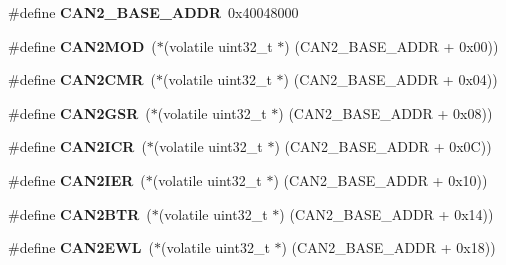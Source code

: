 \begin{DoxyCompactItemize}
\mbox{\label{group__lpc24xx__regs_ga6e8917334a8169aca752577ba0c27b8b}} 
\#define {\bfseries C\+A\+N2\+\_\+\+B\+A\+S\+E\+\_\+\+A\+D\+DR}~0x40048000
\item 
\mbox{\label{group__lpc24xx__regs_ga2abc61e5c8a37e1ddca5490e1e3fb149}} 
\#define {\bfseries C\+A\+N2\+M\+OD}~($\ast$(volatile uint32\+\_\+t $\ast$) (C\+A\+N2\+\_\+\+B\+A\+S\+E\+\_\+\+A\+D\+DR + 0x00))
\item 
\mbox{\label{group__lpc24xx__regs_gade2e60da875c96b0e65087ed452283ca}} 
\#define {\bfseries C\+A\+N2\+C\+MR}~($\ast$(volatile uint32\+\_\+t $\ast$) (C\+A\+N2\+\_\+\+B\+A\+S\+E\+\_\+\+A\+D\+DR + 0x04))
\item 
\mbox{\label{group__lpc24xx__regs_gaaa1e489054a831e3810988f64a482eed}} 
\#define {\bfseries C\+A\+N2\+G\+SR}~($\ast$(volatile uint32\+\_\+t $\ast$) (C\+A\+N2\+\_\+\+B\+A\+S\+E\+\_\+\+A\+D\+DR + 0x08))
\item 
\mbox{\label{group__lpc24xx__regs_ga08b64239e6c900c4c312afe510d610c3}} 
\#define {\bfseries C\+A\+N2\+I\+CR}~($\ast$(volatile uint32\+\_\+t $\ast$) (C\+A\+N2\+\_\+\+B\+A\+S\+E\+\_\+\+A\+D\+DR + 0x0\+C))
\item 
\mbox{\label{group__lpc24xx__regs_gaf450c07b9f55536135ace52ff0073bc2}} 
\#define {\bfseries C\+A\+N2\+I\+ER}~($\ast$(volatile uint32\+\_\+t $\ast$) (C\+A\+N2\+\_\+\+B\+A\+S\+E\+\_\+\+A\+D\+DR + 0x10))
\item 
\mbox{\label{group__lpc24xx__regs_gaa8a52390ef63be2a18c43783ac34c859}} 
\#define {\bfseries C\+A\+N2\+B\+TR}~($\ast$(volatile uint32\+\_\+t $\ast$) (C\+A\+N2\+\_\+\+B\+A\+S\+E\+\_\+\+A\+D\+DR + 0x14))
\item 
\mbox{\label{group__lpc24xx__regs_ga2495fd16f537ce3541d6a247d38f860c}} 
\#define {\bfseries C\+A\+N2\+E\+WL}~($\ast$(volatile uint32\+\_\+t $\ast$) (C\+A\+N2\+\_\+\+B\+A\+S\+E\+\_\+\+A\+D\+DR + 0x18))
\item 
\mbox{\label{group__lpc24xx__regs_ga4bb3d70f1d74200a218d77b6a8bfaf0b}} 

\end{DoxyCompactItemize}
